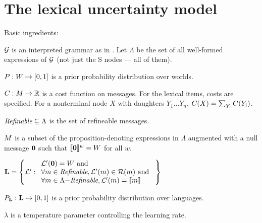 \documentclass{article}
\begin{document}

\section{The lexical uncertainty model}\label{sec:model}

\begin{examples}
\item\label{modobjects} Basic ingredients:
  \begin{examples}
  \item $\mathcal{G}$ is an interpreted grammar as in . Let
    $\Lambda$ be the set of all well-formed expressions of $\mathcal{G}$
    (not just the S nodes --- all of them).

  \item $P : W \mapsto [0,1]$ is a prior probability
    distribution over worlds.

  \item $C : M \mapsto \mathbb{R}$ is a cost function on
    messages.  For the lexical items, costs are specified. For a
    nonterminal node $X$ with daughters $Y_{1} \ldots Y_{n}$,
    $C(X) = \sum_{Y_{i}}C(Y_{i})$.

  \item\label{enrichable}%
    $\textit{Refinable} \subseteq \Lambda$ is the set of refineable messages.

  \item $M$ is a subset of the proposition-denoting
    expressions in $\Lambda$ augmented with a null message $\mathbf{0}$
    such that $\llbracket\text{$\mathbf{0}$}\rrbracket^{w} = W$ for all $w$.

  \item\label{lexset}%
    $\mathbf{L} = \left\{ \mathcal{L}' :       
      \begin{array}[c]{l}
        \mathcal{L}'(\mathbf{0}) = W \text{ and } \\ 
        \forall m \in \textit{Refinable}, \mathcal{L}'(m) \in \mathcal{R}(m) \text{ and } \\
        \forall m \in \Lambda{-}\textit{Refinable}, \mathcal{L}'(m) = \llbracket m\rrbracket
      \end{array} \right\}$
  
  \item $P_{\mathbf{L}} : \mathbf{L} \mapsto [0,1]$ is a prior probability distribution over languages.    
  
  \item $\lambda$ is a temperature parameter controlling the learning rate.
  \end{examples}


\end{examples}
\end{document}
